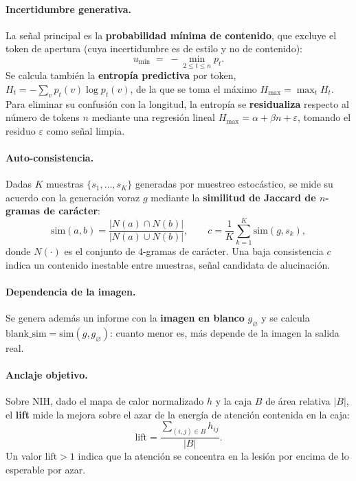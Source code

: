 \paragraph{Incertidumbre generativa.} La señal principal es la \textbf{probabilidad mínima de
contenido}, que excluye el token de apertura (cuya incertidumbre es de estilo y no de contenido):
\begin{equation}
u_{\min} \;=\; -\!\!\min_{2 \le t \le n} p_t .
\end{equation}
Se calcula también la \textbf{entropía predictiva} por token, $H_t = -\sum_{v} p_t(v)\log p_t(v)$, de
la que se toma el máximo $H_{\max}=\max_t H_t$. Para eliminar su confusión con la longitud, la
entropía se \textbf{residualiza} respecto al número de tokens $n$ mediante una regresión lineal
$H_{\max} = \alpha + \beta n + \varepsilon$, tomando el residuo $\varepsilon$ como señal limpia.

\paragraph{Auto-consistencia.} Dadas $K$ muestras $\{s_1,\dots,s_K\}$ generadas por muestreo
estocástico, se mide su acuerdo con la generación voraz $g$ mediante la \textbf{similitud de Jaccard
de $n$-gramas de carácter}:
\begin{equation}
\mathrm{sim}(a,b) = \frac{|N(a)\cap N(b)|}{|N(a)\cup N(b)|},\qquad
c = \frac{1}{K}\sum_{k=1}^{K}\mathrm{sim}(g,s_k),
\end{equation}
donde $N(\cdot)$ es el conjunto de $4$-gramas de carácter. Una baja consistencia $c$ indica un
contenido inestable entre muestras, señal candidata de alucinación.

\paragraph{Dependencia de la imagen.} Se genera además un informe con la \textbf{imagen en blanco}
$g_{\varnothing}$ y se calcula $\mathrm{blank\_sim} = \mathrm{sim}(g, g_{\varnothing})$: cuanto menor
es, más depende de la imagen la salida real.

\paragraph{Anclaje objetivo.} Sobre NIH, dado el mapa de calor normalizado $h$ y la caja $B$ de área
relativa $|B|$, el \textbf{lift} mide la mejora sobre el azar de la energía de atención contenida en
la caja:
\begin{equation}
\mathrm{lift} = \frac{\sum_{(i,j)\in B} h_{ij}}{|B|}.
\end{equation}
Un valor $\mathrm{lift}>1$ indica que la atención se concentra en la lesión por encima de lo
esperable por azar.

